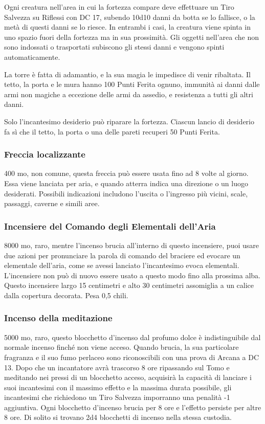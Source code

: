 \begin{multicols}{2}
Ogni creatura nell'area in cui la fortezza compare deve effettuare un Tiro Salvezza su Riflessi con DC 17, subendo 10d10 danni da botta se lo fallisce, o la metà di questi danni se lo riesce. In entrambi i casi, la creatura viene spinta in uno spazio fuori della fortezza ma in sua prossimità. Gli oggetti nell'area che non sono indossati o trasportati subiscono gli stessi danni e vengono spinti automaticamente.

La torre è fatta di adamantio, e la sua magia le impedisce di venir ribaltata. Il tetto, la porta e le mura hanno 100 Punti Ferita ognuno, immunità ai danni dalle armi non magiche a eccezione delle armi da assedio, e resistenza a tutti gli altri danni.

Solo l'incantesimo desiderio può riparare la fortezza. Ciascun lancio di desiderio fa sì che il tetto, la porta o una delle pareti recuperi 50 Punti Ferita.


\subsubsection*{Freccia localizzante}
400 mo, non comune, questa freccia può essere usata fino ad 8 volte al giorno. Essa viene lanciata per aria, e quando atterra indica una direzione o un luogo desiderati. Possibili indicazioni includono l'uscita o l'ingresso più vicini, scale, passaggi, caverne e simili aree.

\subsubsection*{Incensiere del Comando degli Elementali dell'Aria}
8000 mo, raro, mentre l'incenso brucia all'interno di questo incensiere, puoi usare due azioni per pronunciare la parola di comando del braciere ed evocare un elementale dell'aria, come se avessi lanciato l'incantesimo evoca elementali. L'incensiere non può di nuovo essere usato a questo modo fino alla prossima alba. Questo incensiere largo 15 centimetri e alto 30 centimetri assomiglia a un calice dalla copertura decorata. Pesa 0,5 chili.

\subsubsection*{Incenso della meditazione}
5000 mo, raro, questo blocchetto d’incenso dal profumo dolce è indistinguibile dal normale incenso finché non viene acceso. Quando brucia, la sua particolare fragranza e il suo fumo perlaceo sono riconoscibili con una prova di Arcana a DC 13. Dopo che un incantatore avrà trascorso 8 ore ripassando sul Tomo e meditando nei pressi di un blocchetto acceso, acquisirà la capacità di lanciare i suoi incantesimi con il massimo effetto e la massima durata possibile, gli incantesimi che richiedono un Tiro Salvezza imporranno una penalità -1 aggiuntiva. Ogni blocchetto d’incenso brucia per 8 ore e l’effetto persiste per altre 8 ore. Di solito si trovano 2d4 blocchetti di incenso nella stessa custodia.


\end{multicols}
